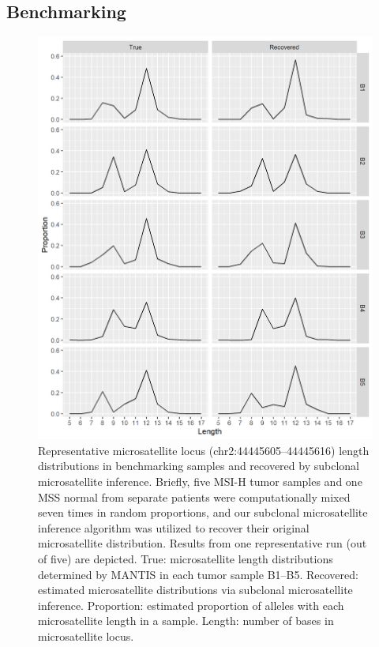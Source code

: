\subsection{Benchmarking}
\label{ssec:msiclones:benchmarking}
\begin{figure}[htp]
	\centering
	\includegraphics[width=0.8\linewidth,keepaspectratio]{images/msiclones/benchmark_loci}
	\caption[Representative microsatellite locus length distributions in benchmarking samples and recovered by subclonal microsatellite inference.]{Representative microsatellite locus (chr2:44445605--44445616) length distributions in benchmarking samples and recovered by subclonal microsatellite inference. Briefly, five MSI-H tumor samples and one MSS normal from separate patients were computationally mixed seven times in random proportions, and our subclonal microsatellite inference algorithm was utilized to recover their original microsatellite distribution. Results from one representative run (out of five) are depicted. True: microsatellite length distributions determined by MANTIS in each tumor sample B1--B5. Recovered: estimated microsatellite distributions via subclonal microsatellite inference. Proportion: estimated proportion of alleles with each microsatellite length in a sample. Length: number of bases in microsatellite locus.}
	\label{fig:msiclones:benchmark_locus}
\end{figure}

